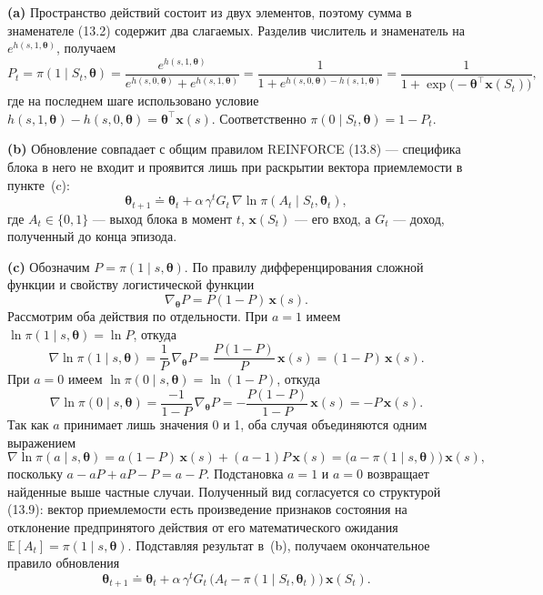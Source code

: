 \begin{solution}
    \textbf{(a)} Пространство действий состоит из двух элементов, поэтому сумма
    в знаменателе (13.2) содержит два слагаемых. Разделив числитель и знаменатель
    на $e^{h(s,1,\boldsymbol\theta)}$, получаем
    \[
        P_t = \pi(1\mid S_t,\boldsymbol\theta)
        = \frac{e^{h(s,1,\boldsymbol\theta)}}{e^{h(s,0,\boldsymbol\theta)}+e^{h(s,1,\boldsymbol\theta)}}
        = \frac{1}{1+e^{h(s,0,\boldsymbol\theta)-h(s,1,\boldsymbol\theta)}}
        = \frac{1}{1+\exp\big(-\boldsymbol\theta^\top\mathbf x(S_t)\big)},
    \]
    где на последнем шаге использовано условие
    $h(s,1,\boldsymbol\theta)-h(s,0,\boldsymbol\theta)=\boldsymbol\theta^\top\mathbf x(s)$.
    Соответственно $\pi(0\mid S_t,\boldsymbol\theta)=1-P_t$.

    \textbf{(b)} Обновление совпадает с общим правилом REINFORCE (13.8) ---
    специфика блока в него не входит и проявится лишь при раскрытии вектора
    приемлемости в пункте~(c):
    \[
        \boldsymbol\theta_{t+1} \doteq \boldsymbol\theta_t
        + \alpha\,\gamma^t G_t\,\nabla\ln\pi(A_t\mid S_t,\boldsymbol\theta_t),
    \]
    где $A_t\in\{0,1\}$ --- выход блока в момент $t$, $\mathbf x(S_t)$ --- его вход,
    а $G_t$ --- доход, полученный до конца эпизода.

    \textbf{(c)} Обозначим $P=\pi(1\mid s,\boldsymbol\theta)$. По правилу
    дифференцирования сложной функции и свойству логистической функции
    \[
        \nabla_{\boldsymbol\theta} P = P(1-P)\,\mathbf x(s).
    \]
    Рассмотрим оба действия по отдельности. При $a=1$ имеем
    $\ln\pi(1\mid s,\boldsymbol\theta)=\ln P$, откуда
    \[
        \nabla\ln\pi(1\mid s,\boldsymbol\theta)
        = \frac{1}{P}\,\nabla_{\boldsymbol\theta}P
        = \frac{P(1-P)}{P}\,\mathbf x(s) = (1-P)\,\mathbf x(s).
    \]
    При $a=0$ имеем $\ln\pi(0\mid s,\boldsymbol\theta)=\ln(1-P)$, откуда
    \[
        \nabla\ln\pi(0\mid s,\boldsymbol\theta)
        = \frac{-1}{1-P}\,\nabla_{\boldsymbol\theta}P
        = -\frac{P(1-P)}{1-P}\,\mathbf x(s) = -P\,\mathbf x(s).
    \]
    Так как $a$ принимает лишь значения 0 и 1, оба случая объединяются одним
    выражением
    \[
        \nabla\ln\pi(a\mid s,\boldsymbol\theta)
        = a(1-P)\,\mathbf x(s) + (a-1)P\,\mathbf x(s)
        = \big(a - \pi(1\mid s,\boldsymbol\theta)\big)\,\mathbf x(s),
    \]
    поскольку $a-aP+aP-P=a-P$. Подстановка $a=1$ и $a=0$ возвращает найденные
    выше частные случаи. Полученный вид согласуется со структурой (13.9):
    вектор приемлемости есть произведение признаков состояния на отклонение
    предпринятого действия от его математического ожидания
    $\mathbb E[A_t]=\pi(1\mid s,\boldsymbol\theta)$. Подставляя результат в~(b),
    получаем окончательное правило обновления
    \[
        \boldsymbol\theta_{t+1} \doteq \boldsymbol\theta_t
        + \alpha\,\gamma^t G_t\,\big(A_t - \pi(1\mid S_t,\boldsymbol\theta_t)\big)\,\mathbf x(S_t).
    \]
\end{solution}
